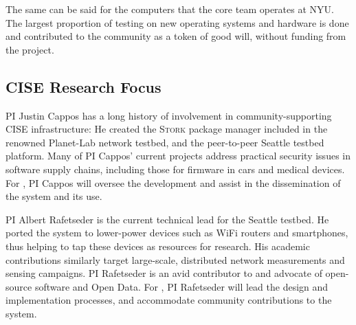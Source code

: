 The same can be said for the computers that the \sysname core
team operates at NYU. The largest proportion of testing on new
operating systems and hardware is done and contributed to the
community as a token of good will, without funding from the project.



\subsection{CISE Research Focus}


PI Justin Cappos has a long history of involvement in
community-supporting CISE infrastructure: He created the \textsc{Stork}
package manager included in the renowned Planet-Lab network testbed,
and the peer-to-peer Seattle testbed platform.
Many of PI Cappos' current projects address practical security issues
in software supply chains, including those for firmware in cars and
medical devices. For \sysname, PI Cappos will oversee the development
and assist in the dissemination of the system and its use.

PI Albert Rafetseder is the current technical lead for the Seattle
testbed. He ported the system to lower-power devices such as WiFi
routers and smartphones, thus helping to tap these devices as
resources for research.
His academic contributions similarly target large-scale, distributed
network measurements and sensing campaigns. PI Rafetseder is an avid
contributor to and advocate of open-source software and Open Data.
For \sysname, PI Rafetseder will lead the design and implementation
processes, and accommodate community contributions to the system.



